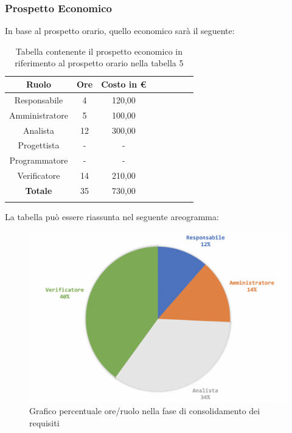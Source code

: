 		\subsubsection{Prospetto Economico}
		In base al prospetto orario, quello economico sarà il seguente: 
		
			\begin{longtable}{|c|c|c|c|c|c|c|c|}
				\hline
				\rowcolor{lighter-grayer}
				\textbf{Ruolo} & \textbf{Ore} & \textbf{Costo in €} \\
				\hline
				\endfirsthead
				
				\hline
				Responsabile & 4 & 120,00\\
				\hline
				\hline
				Amministratore & 5 & 100,00\\
				\hline
				\hline
				Analista & 12 & 300,00\\
				\hline
				\hline
				Progettista & - & -\\
				\hline
				\hline
				Programmatore & -  & -\\
				\hline
				\hline
				Verificatore & 14 & 210,00\\
				\hline
				\textbf{Totale} & 35 & 730,00\\
				\hline
				\caption{Tabella contenente il prospetto economico in riferimento al prospetto orario nella tabella 5}
			\end{longtable}
			\pagebreak
			
			La tabella può essere riassunta nel seguente areogramma:
			\begin{figure}[H]
				\centering
				\includegraphics[width=0.8\linewidth]{./images/consRequisiti2.png}
				\caption{Grafico percentuale ore/ruolo nella fase di consolidamento dei requisiti}
				\label{fig:grafico costi ruolo fase consolidamento dei requisiti}
			\end{figure}
	
